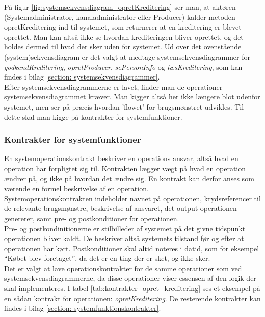 På figur \ref{fig:systemsekvensdiagram_opretKreditering} ser man, at aktøren (Systemadministrator, kanaladministrator eller Producer) kalder metoden opretKreditering ind til systemet, som returnerer at en kreditering er blevet oprettet. Man kan altså ikke se hvordan krediteringen bliver oprettet, og det holdes dermed til hvad der sker uden for systemet. Ud over det ovenstående (system)sekvensdiagram er det valgt at medtage systemsekvensdiagrammer for \textit{godkendKreditering}, \textit{opretProducer}, \textit{sePersonInfo} og \textit{læsKreditering}, som kan findes i bilag \ref{section: systemsekvensdiagrammer}. \\


Efter systemsekvensdiagrammerne er lavet, finder man de operationer systemsekvensdiagrammet kræver. Man kigger altså her ikke længere blot udenfor systemet, men ser på præcis hvordan 'flowet' for brugsmønstret udvikles. Til dette skal man kigge på kontrakter for systemfunktioner.


\subsubsection{Kontrakter for systemfunktioner}
En systemoperationskontrakt beskriver en operations ansvar, altså hvad en operation har forpligtet sig til. Kontrakten lægger vægt på hvad en operation ændrer på, og ikke på hvordan det ændre sig. En kontrakt kan derfor anses som værende en formel beskrivelse af en operation.\\
Systemoperationskontrakten indeholder navnet på operationen, krydsreferencer til de relevante brugsmønstre, beskrivelse af ansvaret, det output operationen genererer, samt pre- og postkonditioner for operationen. \\


Pre- og postkondinitionerne er stilbilleder af systemet på det givne tidspunkt operationen bliver kaldt. De beskriver altså systemets tilstand før og efter at operationen har kørt. Postkonditioner skal altid noteres i datid, som for eksempel “Købet blev foretaget”, da det er en ting der er sket, og ikke sker.\\


Det er valgt at lave operationskontrakter for de samme operationer som ved systemsekvensdiagrammerne, da disse operationer viser essensen af den logik der skal implementeres. I tabel \ref{tab:kontrakter_opret_kreditering} ses et eksempel på en sådan kontrakt for operationen: \textit{opretKreditering}. De resterende kontrakter kan findes i bilag \ref{section: systemfunktionskontrakter}.


